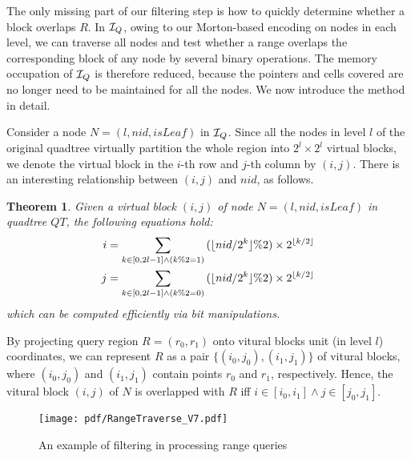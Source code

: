 \documentclass[10pt,conference,letterpaper]{IEEEtran}
\newcommand{\treeindex}{{{\cal I}_Q}\xspace}
\newtheorem{theorem}{Theorem}
\begin{document}
The only missing part of our filtering step is how to quickly determine whether a block overlaps $R$.
In $\treeindex$, owing to our Morton-based encoding on nodes in each level, we can traverse all nodes and test whether a range overlaps the corresponding block of any node by several binary operations. The memory occupation of $\treeindex$ is therefore reduced, because the pointers and cells covered are no longer need to be maintained for all the nodes. We now introduce the method in detail.

Consider a node $N=(l,nid, isLeaf)$ in $\treeindex$.
Since all the nodes in level $l$ of the original quadtree virtually partition the whole region into $2^l\times 2^l$ virtual blocks, we denote the virtual block in the $i$-th row and $j$-th column by $(i,j)$. There is an interesting relationship between $(i,j)$ and $nid$, as follows.
\begin{theorem}
	Given a virtual block $(i,j)$ of node $N=(l,nid, isLeaf)$ in quadtree $QT$, the following equations hold:
	\begin{equation}\label{eq:nid}
	\small
	\begin{aligned}
	i &= \sum_{k\in[0, 2l-1]\wedge (k\%2=1)} {(\lfloor nid/2^k \rfloor\% 2) \times2^{\lfloor k/2\rfloor}} \\
	j &= \sum_{k\in[0, 2l-1]\wedge (k\%2=0)} {(\lfloor nid/2^k \rfloor\% 2) \times2^{\lfloor k/2\rfloor}}
	\end{aligned}
	\end{equation}
	which can be computed efficiently via bit manipulations.
\end{theorem}

By projecting query region $R=(r_0, r_1)$ onto vitural blocks unit (in level $l$) coordinates, we can represent $R$ as a pair $\{(i_0,j_0), (i_1,j_1)\}$ of vitural blocks, where $(i_0,j_0)$ and $(i_1,j_1)$ contain points $r_0$ and $r_1$, respectively.
Hence, the vitural block $(i,j)$ of $N$ is overlapped with $R$ iff
$i\in[i_0, i_1]\wedge j\in[j_0, j_1]$.

\begin{figure}[t]
	\centering
	\texttt{[image: pdf/RangeTraverse\_V7.pdf]}
	\vspace{-.2in}
	\caption{An example of filtering in processing range queries \label{fig:RangeFilter}}
	\vspace{-.1in}
\end{figure}
\end{document}
